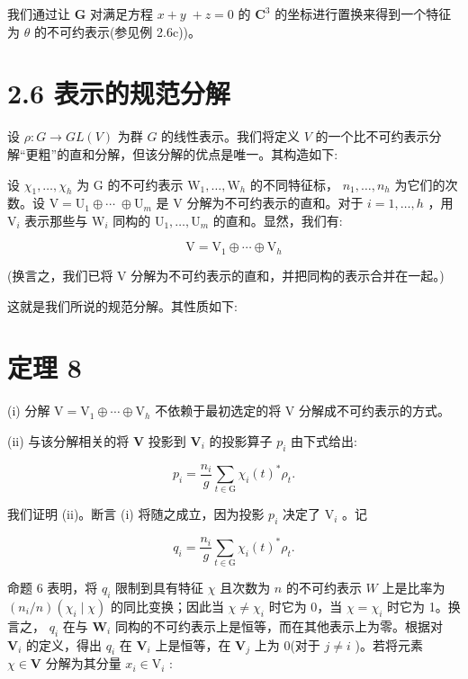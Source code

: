 \documentclass[10pt]{article}
\begin{document}
我们通过让 \(\mathbf{G}\) 对满足方程 \(x + y \; + z = 0\) 的 \({\mathbf{C}}^{3}\) 的坐标进行置换来得到一个特征为 \(\theta\) 的不可约表示(参见例 2.6c))。

\section*{2.6 表示的规范分解}

设 \(\rho  : G \rightarrow  {GL}\left( V\right)\) 为群 \(G\) 的线性表示。我们将定义 \(V\) 的一个比不可约表示分解“更粗”的直和分解，但该分解的优点是唯一。其构造如下:

设 \({\chi }_{1},\ldots ,{\chi }_{h}\) 为 \(\mathrm{G}\) 的不可约表示 \({\mathrm{W}}_{1},\ldots ,{\mathrm{W}}_{h}\) 的不同特征标， \({n}_{1},\ldots ,{n}_{h}\) 为它们的次数。设 \(\mathrm{V} = {\mathrm{U}}_{1} \oplus  \cdots \; \oplus  {\mathrm{U}}_{m}\) 是 \(\mathrm{V}\) 分解为不可约表示的直和。对于 \(i = 1,\ldots ,h\) ，用 \({\mathrm{V}}_{i}\) 表示那些与 \({\mathrm{W}}_{i}\) 同构的 \({\mathrm{U}}_{1},\ldots ,{\mathrm{U}}_{m}\) 的直和。显然，我们有:

\[
\mathrm{V} = {\mathrm{V}}_{1} \oplus  \cdots  \oplus  {\mathrm{V}}_{h}
\]

(换言之，我们已将 V 分解为不可约表示的直和，并把同构的表示合并在一起。)

这就是我们所说的规范分解。其性质如下:

\section*{定理 8}

(i) 分解 \(\mathrm{V} = {\mathrm{V}}_{1} \oplus  \cdots  \oplus  {\mathrm{V}}_{h}\) 不依赖于最初选定的将 \(\mathrm{V}\) 分解成不可约表示的方式。

(ii) 与该分解相关的将 \(\mathbf{V}\) 投影到 \({\mathbf{V}}_{i}\) 的投影算子 \({p}_{i}\) 由下式给出:

\[
{p}_{i} = \frac{{n}_{i}}{g}\mathop{\sum }\limits_{{t \in  \mathrm{G}}}{\chi }_{i}{\left( t\right) }^{ * }{\rho }_{t}.
\]

我们证明 (ii)。断言 (i) 将随之成立，因为投影 \({p}_{i}\) 决定了 \({\mathrm{V}}_{i}\) 。记

\[
{q}_{i} = \frac{{n}_{i}}{g}\mathop{\sum }\limits_{{t \in  \mathrm{G}}}{\chi }_{i}{\left( t\right) }^{ * }{\rho }_{t}.
\]

命题 6 表明，将 \({q}_{i}\) 限制到具有特征 \(\chi\) 且次数为 \(n\) 的不可约表示 \(W\) 上是比率为 \(\left( {{n}_{i}/n}\right) \left( {{\chi }_{i} \mid  \chi }\right)\) 的同比变换；因此当 \(\chi  \neq  {\chi }_{i}\) 时它为 0，当 \(\chi  = {\chi }_{i}\) 时它为 1。换言之， \({q}_{i}\) 在与 \({\mathbf{W}}_{i}\) 同构的不可约表示上是恒等，而在其他表示上为零。根据对 \({\mathbf{V}}_{i}\) 的定义，得出 \({q}_{i}\) 在 \({\mathbf{V}}_{i}\) 上是恒等，在 \({\mathbf{V}}_{j}\) 上为 0(对于 \(j \neq  i\) )。若将元素 \(\chi  \in  \mathbf{V}\) 分解为其分量 \({x}_{i} \in  {\mathrm{V}}_{i}\) :
\end{document}
